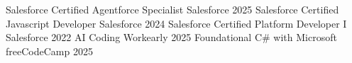 


\begin{cvhonors}

  \cvhonor
    {Salesforce Certified Agentforce Specialist} %
    {Salesforce} %
    {} %
    {2025} %
  \cvhonor
    {Salesforce Certified Javascript Developer} %
    {Salesforce} %
    {} %
    {2024} %
  \cvhonor
    {Salesforce Certified Platform Developer I} %
    {Salesforce} %
    {} %
    {2022} %
  \cvhonor
    {AI Coding} %
    {Workearly} %
    {} %
    {2025} %
  \cvhonor
    {Foundational C\# with Microsoft} %
    {freeCodeCamp} %
    {} %
    {2025} %
\end{cvhonors}